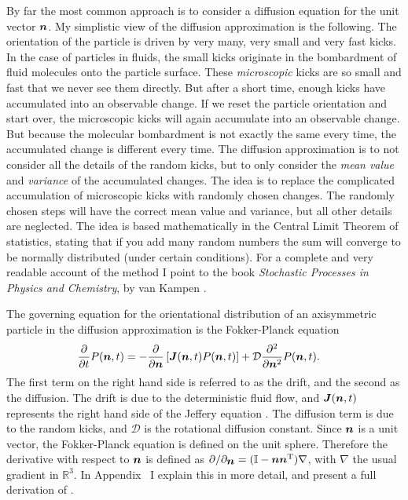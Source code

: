 \documentclass[thesis.tex]{subfiles}
\begin{document}
By far the most common approach is to consider a diffusion equation for the unit vector $\mbox{\boldmath$n$}$. My simplistic view of the diffusion approximation is the following. The orientation of the particle is driven by very many, very small and very fast kicks. In the case of particles in fluids, the small kicks originate in the bombardment of fluid molecules onto the particle surface. These \emph{microscopic} kicks are so small and fast that we never see them directly. But after a short time, enough kicks have accumulated into an observable change. If we reset the particle orientation and start over, the microscopic kicks will again accumulate into an observable change. But because the molecular bombardment is not exactly the same every time, the accumulated change is different every time. The diffusion approximation is to not consider all the details of the random kicks, but to only consider the \emph{mean value} and \emph{variance} of the accumulated changes. The idea is to replace the complicated accumulation of microscopic kicks with randomly chosen changes. The randomly chosen steps will have the correct mean value and variance, but all other details are neglected. The idea is based mathematically in the Central Limit Theorem of statistics, stating that if you add many random numbers the sum will converge to be normally distributed (under certain conditions). For a complete and very readable account of the method I point to the book \emph{Stochastic Processes in Physics and Chemistry}, by van Kampen \cite{kampen2007}.

The governing equation for the orientational distribution of an axisymmetric particle in the diffusion approximation is the Fokker-Planck equation
\begin{align}
	\frac{\partial}{\partial t}P(\ve n, t) &= -\frac{\partial}{\partial \ve n}\left[\ve J (\ve n, t)P(\ve n, t)\right] + \mathcal D \frac{\partial^2}{\partial \ve n^2}P(\ve n, t).\eqnlab{fpejeff}
\end{align}
The first term on the right hand side is referred to as the drift, and the second as the diffusion. The drift is due to the deterministic fluid flow, and $\mbox{\boldmath$J$}(\mbox{\boldmath$n$}, t)$ represents the right hand side of the Jeffery equation . The diffusion term is due to the random kicks, and $\mathcal D$ is the rotational diffusion constant. Since $\mbox{\boldmath$n$}$ is a unit vector, the Fokker-Planck equation is defined on the unit sphere. Therefore the derivative with respect to $\mbox{\boldmath$n$}$ is defined as $\partial/\partial_{\mbox{\boldmath$n$}} = (\mathbb{I}-\mbox{\boldmath$n$}\mbox{\boldmath$n$}^{\mathrm T})\nabla$, with $\nabla$ the usual gradient in $\mathbb R^3$. In Appendix~ I explain this in more detail, and present a full derivation of . 
\end{document}
